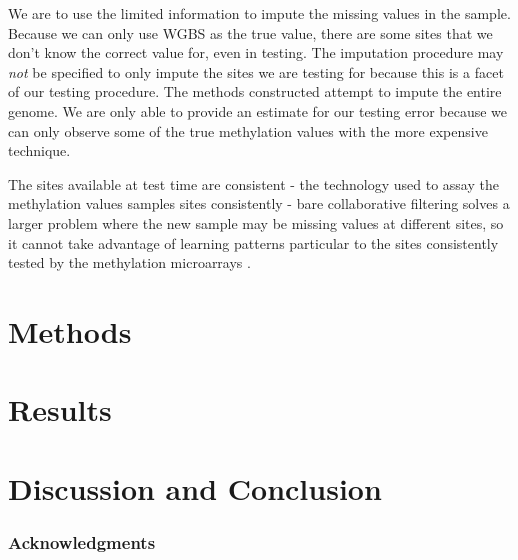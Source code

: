 \documentclass{article} %
\begin{document}
We are to use the limited information to impute the missing values in the sample. Because we can only use WGBS as the true value, there are some sites that we don't know the correct value for, even in testing. The imputation procedure may {\em not} be specified to only impute the sites we are testing for because this is a facet of our testing procedure. The methods constructed attempt to impute the entire genome. We are only able to provide an estimate for our testing error because we can only observe some of the true methylation values with the more expensive technique.

The sites available at test time are consistent - the technology used to assay the methylation values samples sites consistently - bare collaborative filtering solves a larger problem where the new sample may be missing values at different sites, so it cannot take advantage of learning patterns particular to the sites consistently tested by the methylation microarrays \cite{infinium}.


\section{Methods}


\section{Results}

\section{Discussion and Conclusion}

\subsubsection*{Acknowledgments}



\end{document}
